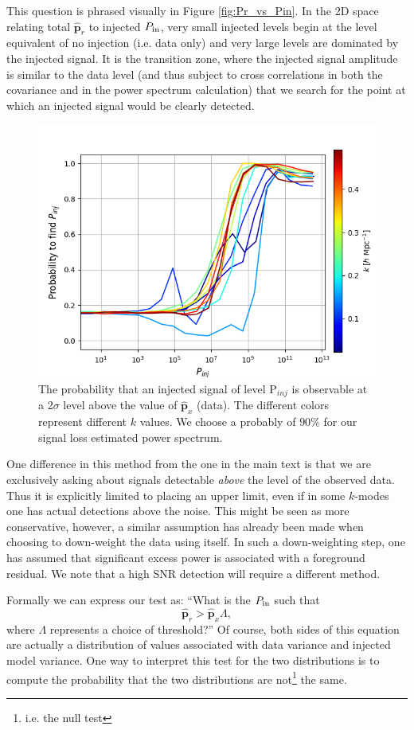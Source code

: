 \documentclass[preprint2,numberedappendix,tighten]{aastex6}  %
\begin{document}
This question is phrased visually in Figure \ref{fig:Pr_vs_Pin}. In the 2D space relating total $\hat{\textbf{p}}_r$ to injected $P_{\rm in}$, very small injected levels begin at the level equivalent of no injection (i.e. data only) and very large levels are dominated by the injected signal. It is the transition zone, where the injected signal amplitude is similar to the data level (and thus subject to cross correlations in both the covariance and in the power spectrum calculation) that we search for the point at which an injected signal would be clearly detected.
  
\begin{figure}[tp]
\centering
\includegraphics[width=.5\textwidth]{plots/method2_prob_vs_pinj.png}
\caption{The probability that an injected signal of level P$_{inj}$
is observable at a 2$\sigma$ level above the value of $\hat{\textbf{p}}_{x}$ (data).
The different colors represent different $k$ values. We choose a probably of $90\%$ for our signal loss estimated power spectrum.
\label{fig:Prob_vs_Pin}}
\end{figure}  
  
One difference in this method from the one in the main text is that we are exclusively asking about signals detectable \emph{above} the level of the observed data. Thus it is explicitly limited to placing an upper limit, even if in some $k$-modes one has actual detections above the noise.  This might be seen as more conservative, however, a similar assumption has already been made when choosing to down-weight the data using itself. In such a down-weighting step, one has assumed that significant excess power is associated with a foreground residual. We note that a high SNR detection will require a different method.
  
Formally we can express our test as: ``What is the $P_{\rm in}$ such that
\begin{equation}
\hat{\textbf{p}}_{r} > \hat{\textbf{p}}_{x} \Lambda,
\end{equation}  
where $\Lambda$ represents a choice of threshold?'' Of course, both sides of this equation are actually a distribution of values associated with data variance and injected model variance. One way to interpret this test for the two distributions is to compute the probability that the two distributions are not\footnote{i.e. the null test} the same.  
 
\end{document}
